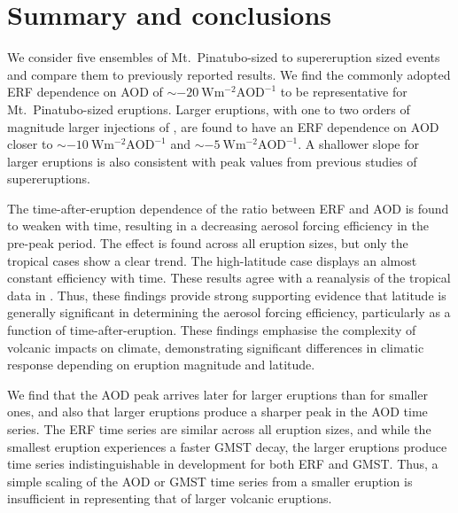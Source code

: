 \documentclass[draft]{agujournal2019}
\begin{document}
  \section{Summary and conclusions}

  \label{sec:conclusions}

  We consider five ensembles of Mt.\ Pinatubo-sized to supereruption sized events and
  compare them to previously reported results. We find the commonly adopted ERF
  dependence on AOD of \(\sim\SI{-20}{\watt\metre^{-2}\mathrm{AOD}^{-1}}\) to be
  representative for Mt.\
  Pinatubo-sized eruptions. Larger eruptions, with one to two orders of magnitude larger
  injections of \ce{SO2}, are found to have an ERF dependence on AOD closer to
  \(\sim\SI{-10}{\watt\metre^{-2}\mathrm{AOD}^{-1}}\) and
  \(\sim\SI{-5}{\watt\metre^{-2}\mathrm{AOD}^{-1}}\). A shallower slope for larger
  eruptions is also consistent with peak values from previous studies of supereruptions.

  The time-after-eruption dependence of the ratio between ERF and AOD is found to weaken
  with time, resulting in a decreasing aerosol forcing efficiency in the pre-peak
  period. The effect is found across all eruption sizes, but only the tropical cases
  show a clear trend. The high-latitude case displays an almost constant efficiency with
  time. These results agree with a reanalysis of the tropical data in
  \citeA{marshall2020dataset}. Thus, these findings provide strong supporting evidence
  that latitude is generally significant in determining the aerosol forcing efficiency,
  particularly as a function of time-after-eruption. These findings emphasise the
  complexity of volcanic impacts on climate, demonstrating significant differences in
  climatic response depending on eruption magnitude and latitude.

  We find that the AOD peak arrives later for larger eruptions than for smaller ones,
  and also that larger eruptions produce a sharper peak in the AOD time series. The ERF
  time series are similar across all eruption sizes, and while the smallest eruption
  experiences a faster GMST decay, the larger eruptions produce time series
  indistinguishable in development for both ERF and GMST. Thus, a simple scaling of the
  AOD or GMST time series from a smaller eruption is insufficient in representing that
  of larger volcanic eruptions.
\end{document}
